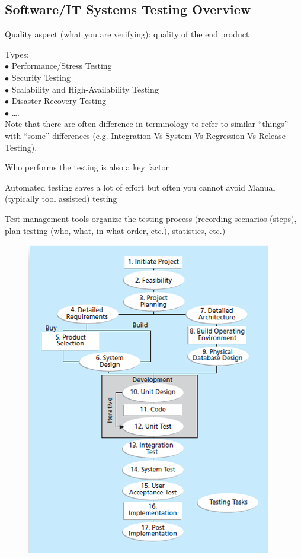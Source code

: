 \documentclass[]{project_plan}
\newcommand{\bulletPoint}{\hspace{-3.1pt}$\bullet$ \hspace{5pt}}
\begin{document}
\newpage

\subsection{Software/IT Systems Testing Overview}

Quality aspect (what you are verifying): quality of the end product

Types;\\
\bulletPoint Performance/Stress Testing\\
\bulletPoint Security Testing\\
\bulletPoint Scalability and High-Availability Testing\\
\bulletPoint Disaster Recovery Testing\\
\bulletPoint….\\
Note that there are often difference in terminology to refer to
similar “things” with “some” differences (e.g. Integration Vs System
Vs Regression Vs Release Testing).

Who performs the testing is also a key factor

Automated testing saves a lot of effort but often you cannot avoid
Manual (typically tool assisted) testing

Test management tools organize the testing process (recording scenarios (steps),
plan testing (who, what, in what order, etc.), statistics, etc.)

\begin{figure}[H]
  \centering
  \includegraphics[width=.7\linewidth]{testingOverview.png}
\end{figure}
\end{document}
